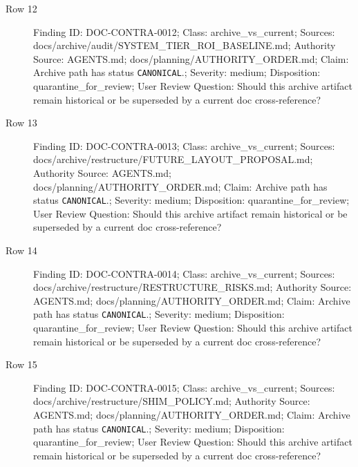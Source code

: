 \documentclass[10.5pt,a4paper,openany]{book}
\begin{document}
\begin{description}
\item[Row 12] Finding ID: DOC-\allowbreak{}CONTRA-\allowbreak{}0012; Class: archive\_\allowbreak{}vs\_\allowbreak{}current; Sources: docs/\allowbreak{}archive/\allowbreak{}audit/\allowbreak{}SYSTEM\_\allowbreak{}TIER\_\allowbreak{}ROI\_\allowbreak{}BASELINE.\allowbreak{}md; Authority Source: AGENTS.\allowbreak{}md; docs/\allowbreak{}planning/\allowbreak{}AUTHORITY\_\allowbreak{}ORDER.\allowbreak{}md; Claim: Archive path has status \texttt{CANONICAL}.\allowbreak{}; Severity: medium; Disposition: quarantine\_\allowbreak{}for\_\allowbreak{}review; User Review Question: Should this archive artifact remain historical or be superseded by a current doc cross-\allowbreak{}reference?
\item[Row 13] Finding ID: DOC-\allowbreak{}CONTRA-\allowbreak{}0013; Class: archive\_\allowbreak{}vs\_\allowbreak{}current; Sources: docs/\allowbreak{}archive/\allowbreak{}restructure/\allowbreak{}FUTURE\_\allowbreak{}LAYOUT\_\allowbreak{}PROPOSAL.\allowbreak{}md; Authority Source: AGENTS.\allowbreak{}md; docs/\allowbreak{}planning/\allowbreak{}AUTHORITY\_\allowbreak{}ORDER.\allowbreak{}md; Claim: Archive path has status \texttt{CANONICAL}.\allowbreak{}; Severity: medium; Disposition: quarantine\_\allowbreak{}for\_\allowbreak{}review; User Review Question: Should this archive artifact remain historical or be superseded by a current doc cross-\allowbreak{}reference?
\item[Row 14] Finding ID: DOC-\allowbreak{}CONTRA-\allowbreak{}0014; Class: archive\_\allowbreak{}vs\_\allowbreak{}current; Sources: docs/\allowbreak{}archive/\allowbreak{}restructure/\allowbreak{}RESTRUCTURE\_\allowbreak{}RISKS.\allowbreak{}md; Authority Source: AGENTS.\allowbreak{}md; docs/\allowbreak{}planning/\allowbreak{}AUTHORITY\_\allowbreak{}ORDER.\allowbreak{}md; Claim: Archive path has status \texttt{CANONICAL}.\allowbreak{}; Severity: medium; Disposition: quarantine\_\allowbreak{}for\_\allowbreak{}review; User Review Question: Should this archive artifact remain historical or be superseded by a current doc cross-\allowbreak{}reference?
\item[Row 15] Finding ID: DOC-\allowbreak{}CONTRA-\allowbreak{}0015; Class: archive\_\allowbreak{}vs\_\allowbreak{}current; Sources: docs/\allowbreak{}archive/\allowbreak{}restructure/\allowbreak{}SHIM\_\allowbreak{}POLICY.\allowbreak{}md; Authority Source: AGENTS.\allowbreak{}md; docs/\allowbreak{}planning/\allowbreak{}AUTHORITY\_\allowbreak{}ORDER.\allowbreak{}md; Claim: Archive path has status \texttt{CANONICAL}.\allowbreak{}; Severity: medium; Disposition: quarantine\_\allowbreak{}for\_\allowbreak{}review; User Review Question: Should this archive artifact remain historical or be superseded by a current doc cross-\allowbreak{}reference?

\end{description}
\end{document}
